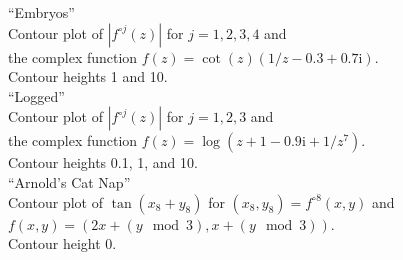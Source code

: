 \noindent``Embryos'' \\
Contour plot of $|f^{\circ j}(z)|$ for $j=1, 2, 3, 4$ and \\
the complex function $f(z) = \cot(z)(1/z - 0.3 + 0.7\mathrm{i})$. \\
Contour heights 1 and 10.\\[2em]

\noindent``Logged'' \\
Contour plot of $|f^{\circ j}(z)|$ for $j = 1, 2, 3$ and \\
the complex function $f(z) = \log(z + 1 -0.9\mathrm{i} + 1/z^7)$.\\
Contour heights 0.1, 1, and 10.\\[2em]

\noindent ``Arnold's Cat Nap'' \\
Contour plot of $\tan(x_8 + y_8)$ for $(x_8, y_8) = f^{\circ 8}(x, y)$ and \\
$f(x, y) = (2x + (y \mod 3), x + (y \mod 3))$. \\
Contour height 0.
